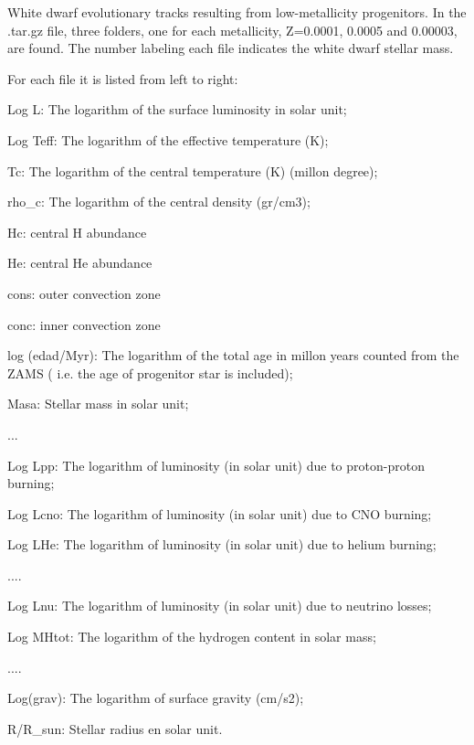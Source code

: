 
White  dwarf evolutionary  tracks  resulting   from  low-metallicity
progenitors.   In  the  .tar.gz  file, three  folders,  one  for  each
metallicity,  Z=0.0001, 0.0005  and  0.00003, are  found.  The  number
labeling each file indicates the white dwarf stellar mass.

For each file it is listed from left to right:


Log L: The logarithm of the surface luminosity in solar unit;

Log Teff: The logarithm of the effective temperature (K);

Tc: The logarithm of the central temperature (K) (millon degree);

rho_c: The logarithm of the central density (gr/cm3);

Hc: central H abundance

He: central He abundance

cons: outer convection zone

conc: inner convection zone

log (edad/Myr): The logarithm of the total age in millon years counted from the ZAMS (
i.e. the age of progenitor star is included);

Masa: Stellar mass in solar unit;

...

Log Lpp: The logarithm of luminosity (in solar unit) due to proton-proton burning;

Log Lcno: The logarithm of luminosity (in solar unit) due to CNO burning;

Log LHe: The logarithm of luminosity (in solar unit) due to helium burning;

....

Log Lnu: The logarithm of luminosity (in solar unit) due to neutrino losses;

Log MHtot: The logarithm of the hydrogen content in solar mass;

....

Log(grav): The logarithm of surface gravity (cm/s2);

R/R_sun: Stellar radius en solar unit.
